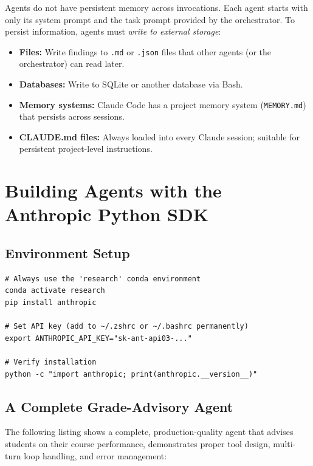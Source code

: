\documentclass[11pt,letterpaper]{article}
\begin{document}
Agents do not have persistent memory across invocations. Each agent starts with only its system prompt and the task prompt provided by the orchestrator. To persist information, agents must \emph{write to external storage}:

\begin{itemize}[leftmargin=*]
    \item \textbf{Files:} Write findings to \texttt{.md} or \texttt{.json} files that other agents (or the orchestrator) can read later.
    \item \textbf{Databases:} Write to SQLite or another database via Bash.
    \item \textbf{Memory systems:} Claude Code has a project memory system (\texttt{MEMORY.md}) that persists across sessions.
    \item \textbf{CLAUDE.md files:} Always loaded into every Claude session; suitable for persistent project-level instructions.
\end{itemize}

\section{Building Agents with the Anthropic Python SDK}

\subsection{Environment Setup}

\begin{lstlisting}[style=BashStyle, caption={Environment setup (conda, as required)}]
# Always use the 'research' conda environment
conda activate research
pip install anthropic

# Set API key (add to ~/.zshrc or ~/.bashrc permanently)
export ANTHROPIC_API_KEY="sk-ant-api03-..."

# Verify installation
python -c "import anthropic; print(anthropic.__version__)"
\end{lstlisting}

\subsection{A Complete Grade-Advisory Agent}

The following listing shows a complete, production-quality agent that advises students on their course performance, demonstrates proper tool design, multi-turn loop handling, and error management:
\end{document}
